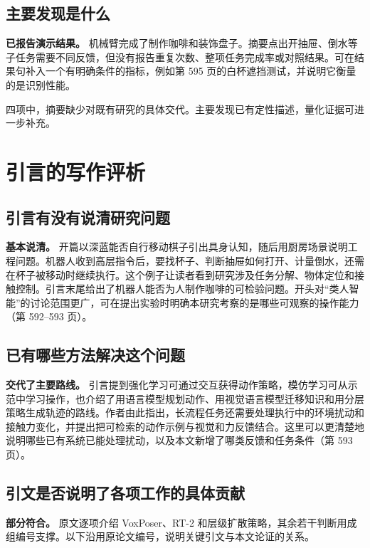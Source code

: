 \documentclass[UTF8,11pt,a4paper,twoside,fontset=none,heading=false]{ctexart}
\begin{document}
\subsection{主要发现是什么}

\textbf{已报告演示结果。} 机械臂完成了制作咖啡和装饰盘子。摘要点出开抽屉、倒水等子任务需要不同反馈，但没有报告重复次数、整项任务完成率或对照结果。可在结果句补入一个有明确条件的指标，例如第 595 页的白杯遮挡测试，并说明它衡量的是识别性能。

四项中，摘要缺少对既有研究的具体交代。主要发现已有定性描述，量化证据可进一步补充。

\section{引言的写作评析}

\subsection{引言有没有说清研究问题}

\textbf{基本说清。} 开篇以深蓝能否自行移动棋子引出具身认知，随后用厨房场景说明工程问题。机器人收到高层指令后，要找杯子、判断抽屉如何打开、计量倒水，还需在杯子被移动时继续执行。这个例子让读者看到研究涉及任务分解、物体定位和接触控制。引言末尾给出了机器人能否为人制作咖啡的可检验问题。开头对“类人智能”的讨论范围更广，可在提出实验时明确本研究考察的是哪些可观察的操作能力（第 592--593 页）。

\subsection{已有哪些方法解决这个问题}

\textbf{交代了主要路线。} 引言提到强化学习可通过交互获得动作策略，模仿学习可从示范中学习操作，也介绍了用语言模型规划动作、用视觉语言模型迁移知识和用分层策略生成轨迹的路线。作者由此指出，长流程任务还需要处理执行中的环境扰动和接触力变化，并提出把可检索的动作示例与视觉和力反馈结合。这里可以更清楚地说明哪些已有系统已能处理扰动，以及本文新增了哪类反馈和任务条件（第 593 页）。

\subsection{引文是否说明了各项工作的具体贡献}

\textbf{部分符合。} 原文逐项介绍 VoxPoser、RT-2 和层级扩散策略，其余若干判断用成组编号支撑。以下沿用原论文编号，说明关键引文与本文论证的关系。
\end{document}
